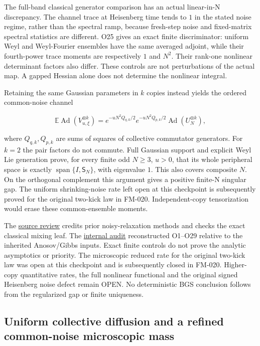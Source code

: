 The full-band classical generator comparison has an actual linear-in-N
discrepancy. The channel trace at Heisenberg time tends to \(1\) in the
stated noise regime, rather than the spectral ramp, because fresh-step
noise and fixed-matrix spectral statistics are different. O25 gives an
exact finite discriminator: uniform Weyl and Weyl-Fourier ensembles
have the same averaged adjoint, while their fourth-power trace moments
are respectively \(1\) and \(N^2\). Their rank-one nonlinear determinant factors
also differ. These controls are not perturbations of the actual map.
A gapped Hessian alone does not determine the nonlinear integral.

Retaining the same Gaussian parameters in \(k\) copies instead yields
the ordered common-noise channel

\[
\mathbb E\operatorname{Ad}(V_{u,\xi}^{\otimes k})
 =e^{-uN^2Q_{q,k}/2}e^{-uN^2Q_{p,k}/2}
       \operatorname{Ad}(U_N^{\otimes k}),
\]

where \(Q_{q,k},Q_{p,k}\) are sums of squares of collective commutator generators.
For \(k=2\) the pair factors do not commute. Full Gaussian support and
explicit Weyl Lie generation prove, for every finite odd \(N\ge3\), \(u>0\),
that its whole peripheral space is exactly
\(\operatorname{span}\{I,\mathsf S_N\}\), with eigenvalue \(1\). This also
covers composite \(N\). On the orthogonal complement this argument gives a positive
finite-N singular gap. The uniform shrinking-noise rate left open at this
checkpoint is subsequently proved for the original two-kick law in FM-020.
Independent-copy tensorization would erase these common-ensemble moments.

The \href{https://github.com/ChurilovMaksim/BGS/blob/main/literature/frozen_operator_transfer_sources_20261006.md}{source review}
credits prior noisy-relaxation methods and checks the exact classical
mixing leaf. The \href{https://github.com/ChurilovMaksim/BGS/blob/main/archive/record/frozen_operator_transfer_review_20261006.md}{internal audit}
reconstructed O1--O29 relative to the inherited Anosov/Gibbs inputs.
Exact finite controls do not prove the analytic asymptotics or priority.
The microscopic reduced rate for the original two-kick law was open at this
checkpoint and is subsequently closed in FM-020. Higher-copy quantitative
rates, the full nonlinear functional and the original signed Heisenberg
noise defect remain OPEN. No deterministic
BGS conclusion follows from the regularized gap or finite uniqueness.

\hypertarget{uniform-collective-diffusion-and-a-refined-common-noise-microscopic-mass}{%
\subsection{Uniform collective diffusion and a refined common-noise microscopic mass}\label{uniform-collective-diffusion-and-a-refined-common-noise-microscopic-mass}}

